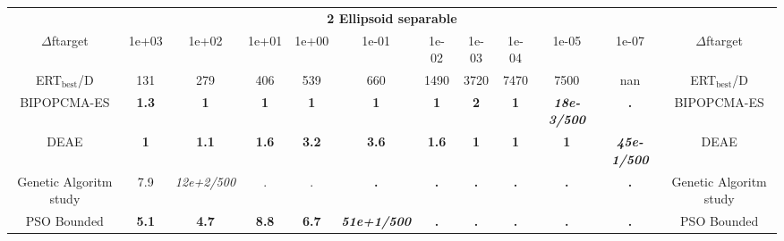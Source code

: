 \begin{tabular}{cccccccccccc}
 & \multicolumn{10}{c}{{\normalsize \textbf{2 Ellipsoid separable}}}\\
$\Delta$ftarget& 1e+03& 1e+02& 1e+01& 1e+00& 1e-01& 1e-02& 1e-03& 1e-04& 1e-05& 1e-07 & $\Delta$ftarget \\
ERT$_{\textrm{best}}$/D& 131& 279& 406& 539& 660& 1490& 3720& 7470& 7500& nan & ERT$_{\textrm{best}}$/D \\
\hline
BIPOPCMA-ES & \textbf{1.3} & \textbf{1} & \textbf{1} & \textbf{1} & \textbf{1} & \textbf{1} & \textbf{2} & \textbf{1} & \textbf{\textit{18e-3}\textit{/500}} & \textbf{.} & BIPOPCMA-ES \cite{add_an_entry_for_BIPOPCMA-ES_in_bbob.bib}\\
DEAE & \textbf{1} & \textbf{1.1} & \textbf{1.6} & \textbf{3.2} & \textbf{3.6} & \textbf{1.6} & \textbf{1} & \textbf{1} & \textbf{1} & \textbf{\textit{45e-1}\textit{/500}} & DEAE \cite{add_an_entry_for_DEAE_in_bbob.bib}\\
Genetic Algoritm study & 7.9 & \textit{12e+2}\textit{/500} & . & . & \textbf{.} & \textbf{.} & \textbf{.} & \textbf{.} & \textbf{.} & \textbf{.} & Genetic Algoritm study \cite{add_an_entry_for_Genetic Algoritm study_in_bbob.bib}\\
PSO Bounded & \textbf{5.1} & \textbf{4.7} & \textbf{8.8} & \textbf{6.7} & \textbf{\textit{51e+1}\textit{/500}} & \textbf{.} & \textbf{.} & \textbf{.} & \textbf{.} & \textbf{.} & PSO Bounded \cite{add_an_entry_for_PSO Bounded_in_bbob.bib}
\end{tabular}
